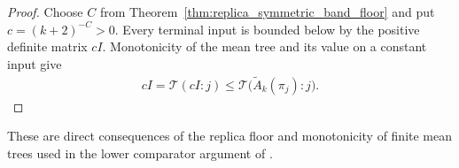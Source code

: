 \begin{proof}\leanok
    Choose $C$ from Theorem~\ref{thm:replica_symmetric_band_floor} and put
    $c=(k+2)^{-C}>0$. Every terminal input is bounded below by the
    positive definite matrix $cI$. Monotonicity of the mean tree and its
    value on a constant input give
    \begin{align}
        cI=\mathcal T(cI:j)
        \le\mathcal T\bigl(\widetilde A_k(\pi_j):j\bigr).
    \end{align}
\end{proof}

These are direct consequences of the replica floor and monotonicity of
finite mean trees used in the lower comparator argument
of \cite{OpenAI2026AreaLaw}.

